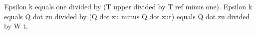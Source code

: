 Epsilon k equals one divided by (T upper divided by T ref minus one).  
Epsilon k equals Q dot zu divided by (Q dot zu minus Q dot zur) equals Q dot zu divided by W t.